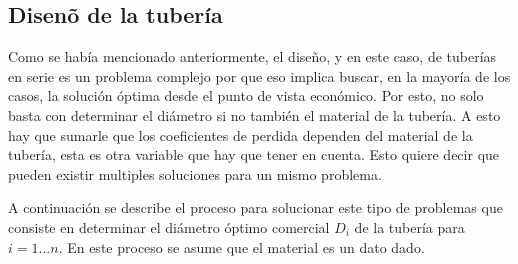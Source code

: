 \documentclass[11pt, oneside]{article}
\begin{document}
\subsection{Disen\~o de la  tuber\'ia}
Como se hab\'ia mencionado anteriormente, el dise\~no, y en este caso, de tuber\'ias en serie es un problema complejo por que eso implica buscar, en la mayor\'ia de los casos, la soluci\'on \'optima desde el punto de vista econ\'omico. Por esto, no solo basta con determinar el di\'ametro si no tambi\'en el material de la tuber\'ia. A esto hay que sumarle que los coeficientes de perdida dependen del material de la tuber\'ia, esta es otra variable que hay que tener en cuenta. Esto quiere decir que pueden existir multiples soluciones para un mismo problema. 

A continuaci\'on se describe el proceso para solucionar este tipo de problemas que consiste en determinar el di\'ametro \'optimo comercial $D_i$ de la tuber\'ia para $i=1...n$. En este proceso se asume que el material es un dato dado. 
\end{document}
